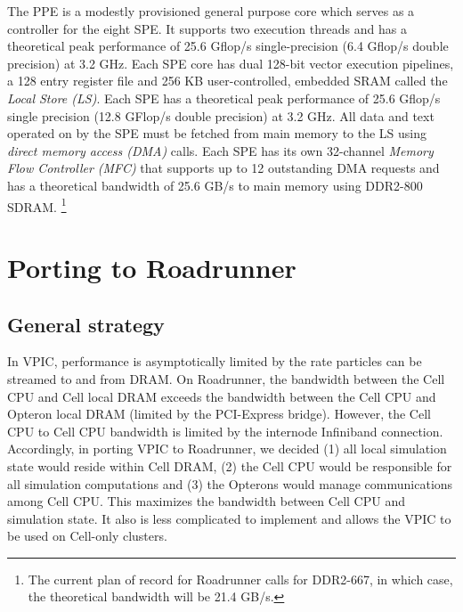 \documentclass[letter,10pt]{article}
\begin{document}
The PPE is a modestly provisioned general purpose core
which serves as a controller for the eight
SPE.  It supports two execution threads and has a theoretical peak
performance of 25.6 Gflop/s single-precision (6.4 Gflop/s double
precision) at 3.2 GHz.  Each SPE core has dual 128-bit vector execution
pipelines, a 128 entry register file and 256 KB user-controlled, embedded
SRAM called the \emph{Local Store (LS)}.  Each SPE has a theoretical
peak performance of 25.6 Gflop/s single precision (12.8 GFlop/s
double precision) at 3.2 GHz.  All data and text operated on by
the SPE must be fetched from main memory to the LS using \emph{direct
memory access (DMA)} calls.  Each SPE has its own 32-channel
\emph{Memory Flow Controller (MFC)} that supports up to 12 outstanding
DMA requests and has a theoretical bandwidth of 25.6 GB/s to main
memory using DDR2-800 SDRAM. \footnote{The current plan of record for
Roadrunner calls for DDR2-667, in which case, the theoretical
bandwidth will be 21.4 GB/s.}



\section{Porting to Roadrunner}

\subsection{General strategy}

In VPIC, performance is asymptotically limited by the rate particles
can be streamed to and from DRAM.  On Roadrunner, the bandwidth
between the Cell CPU and Cell local DRAM exceeds the bandwidth between
the Cell CPU and Opteron local DRAM (limited by the PCI-Express
bridge).  However, the Cell CPU to Cell CPU bandwidth is limited by
the internode Infiniband connection.  Accordingly, in porting VPIC to
Roadrunner, we decided (1) all local simulation state would reside
within Cell DRAM, (2) the Cell CPU would be responsible for all
simulation computations and (3) the Opterons would manage
communications among Cell CPU.  This maximizes the bandwidth
between Cell CPU and simulation state.  It also is less complicated
to implement and allows the VPIC to be used on Cell-only clusters.
\end{document}
